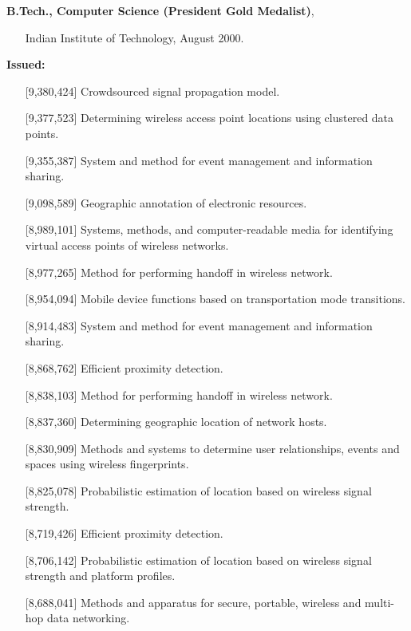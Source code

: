 \begin{resume}
{\bf B.Tech., Computer Science (President Gold Medalist)},
    \begin{itemize}
          \item[] Indian Institute of Technology, August 2000.
    \end{itemize}


\vspace{-0.7cm}

{\bf Issued:}
    \begin{itemize}
       \item [] [9,380,424] Crowdsourced signal propagation model.
       \item [] [9,377,523] Determining wireless access point locations using clustered data points.
       \item [] [9,355,387] System and method for event management and information sharing.
       \item [] [9,098,589] Geographic annotation of electronic resources.
       \item [] [8,989,101] Systems, methods, and computer-readable media for identifying virtual access points of
           wireless networks.
       \item [] [8,977,265] Method for performing handoff in wireless network.
       \item [] [8,954,094] Mobile device functions based on transportation mode transitions.
       \item [] [8,914,483] System and method for event management and information sharing.
       \item [] [8,868,762] Efficient proximity detection.
       \item [] [8,838,103] Method for performing handoff in wireless network.
       \item [] [8,837,360] Determining geographic location of network hosts.
       \item [] [8,830,909] Methods and systems to determine user relationships, events and spaces using wireless
           fingerprints.
       \item [] [8,825,078] Probabilistic estimation of location based on wireless signal strength.
       \item [] [8,719,426] Efficient proximity detection.
       \item [] [8,706,142] Probabilistic estimation of location based on wireless signal strength and platform
           profiles.
       \item [] [8,688,041] Methods and apparatus for secure, portable, wireless and multi-hop data networking.

\end{itemize}
\end{resume}
